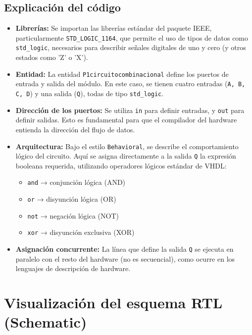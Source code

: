 \documentclass[a4paper,12pt]{article}
\begin{document}
\subsection{Explicación del código}

\begin{itemize}
    \item \textbf{Librerías:} Se importan las librerías estándar del paquete IEEE, particularmente \texttt{STD\_LOGIC\_1164}, que permite el uso de tipos de datos como \texttt{std\_logic}, necesarios para describir señales digitales de uno y cero (y otros estados como 'Z' o 'X').
    
    \item \textbf{Entidad:} La entidad \texttt{P1circuitocombinacional} define los puertos de entrada y salida del módulo. En este caso, se tienen cuatro entradas (\texttt{A, B, C, D}) y una salida (\texttt{Q}), todas de tipo \texttt{std\_logic}.
    
    \item \textbf{Dirección de los puertos:} Se utiliza \texttt{in} para definir entradas, y \texttt{out} para definir salidas. Esto es fundamental para que el compilador del hardware entienda la dirección del flujo de datos.
    
    \item \textbf{Arquitectura:} Bajo el estilo \texttt{Behavioral}, se describe el comportamiento lógico del circuito. Aquí se asigna directamente a la salida \texttt{Q} la expresión booleana requerida, utilizando operadores lógicos estándar de VHDL:
    \begin{itemize}
        \item \texttt{and} → conjunción lógica (AND)
        \item \texttt{or} → disyunción lógica (OR)
        \item \texttt{not} → negación lógica (NOT)
        \item \texttt{xor} → disyunción exclusiva (XOR)
    \end{itemize}
    
    \item \textbf{Asignación concurrente:} La línea que define la salida \texttt{Q} se ejecuta en paralelo con el resto del hardware (no es secuencial), como ocurre en los lenguajes de descripción de hardware.
\end{itemize}

\section{Visualización del esquema RTL (Schematic)}
\end{document}
